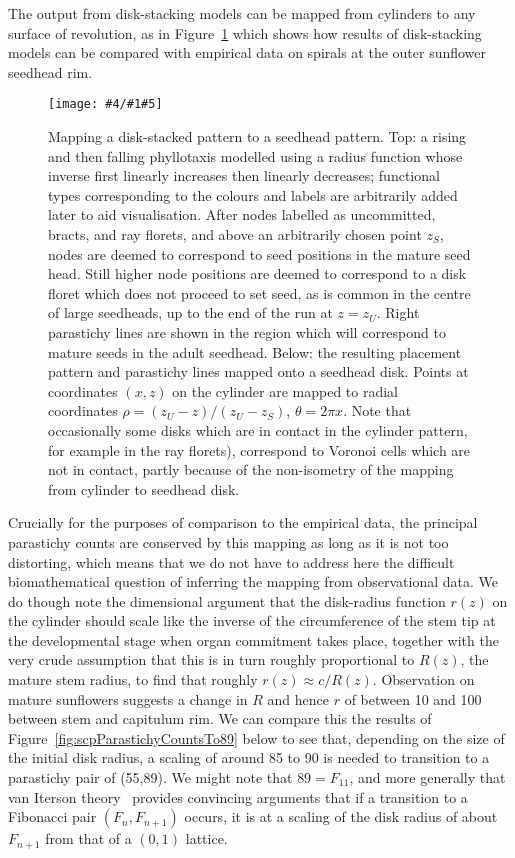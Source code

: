 \documentclass[a4paper,10pt]{amsart}
\newlength{\jfigwidth}
\newcommand{\pdffig}[3]{\jdofig{#1}{#2}{#3}{Figures}{.pdf}}
\newcommand{\jdofig}[5]{
	\begin{figure}\centering\texttt{[image: \#4/\#1\#5]} \caption{#2}\label{fig:#1}\end{figure}
}
\begin{document}
The output from disk-stacking models can be mapped from cylinders to any surface of revolution, as in Figure~\ref{fig:scpConeTransformation} which shows how  results of disk-stacking models can be compared with empirical data on spirals at the outer sunflower seedhead rim. 
%
\pdffig{scpConeTransformation}{Mapping a disk-stacked pattern to a seedhead pattern. Top: a rising and then falling phyllotaxis modelled using a radius function whose inverse first linearly increases then linearly decreases; functional types corresponding to the colours and labels are arbitrarily added later to aid visualisation. After nodes labelled as uncommitted, bracts, and ray florets, and above an arbitrarily chosen point $z_S$, nodes are deemed to correspond to seed positions in the mature seed head.  Still higher node positions are deemed to correspond to a disk floret which does not proceed to set seed, as is common in the centre of large seedheads, up to the end of the run at $z=z_U$.   Right parastichy lines are shown in the region which will correspond to mature seeds in the adult seedhead. Below: the resulting placement pattern and parastichy lines mapped onto a seedhead disk. Points at coordinates $(x,z)$ on the cylinder are mapped to radial coordinates $\rho=(z_U-z)/(z_U-z_S)$, $\theta=2\pi x$. Note that occasionally some disks which are in contact in the cylinder pattern, for example in the ray florets), correspond to Voronoi cells which are not in  contact, partly because of the non-isometry of the mapping from cylinder to seedhead disk.}{1}

Crucially for the purposes of comparison to the empirical data, the principal parastichy counts are conserved by this mapping as long as it is not too distorting, which means that we do not have to address here the difficult biomathematical question of inferring the mapping from observational data. We do though note the dimensional argument that the disk-radius function $r(z)$ on the cylinder should scale like  the inverse of the circumference of the stem tip at the developmental stage when organ commitment takes place, together with the very crude assumption that this is in turn roughly proportional to $R(z)$, the mature stem radius, to find that roughly $r(z)\approx c/R(z)$. Observation on mature sunflowers suggests  a change in $R$ and hence $r$ of between 10 and 100 between stem and capitulum rim. 
We can compare this the results of Figure~\ref{fig:scpParastichyCountsTo89} below to see that, depending on the size of the initial disk radius, a scaling of  around 85 to 90 is needed to transition to a parastichy pair of (55,89). We might note that $89=F_{11}$, and more generally that van Iterson theory~\cite{swintonMathematicalPhyllotaxis2023} provides convincing arguments that if a transition to a Fibonacci pair $(F_n,F_{n+1})$ occurs, it is at a scaling of the disk radius of about $F_{n+1}$ from that of a $(0,1)$ lattice. 
\end{document}

